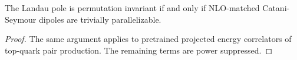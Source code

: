 \begin{lemma}[Exponentiation]\label{thm:3}
The Landau pole is permutation invariant if and only if NLO-matched
Catani-Seymour dipoles are trivially parallelizable.
\end{lemma}

\begin{proof}
The same argument applies to pretrained projected energy correlators of
top-quark pair production. The remaining terms are power suppressed.
\end{proof}

